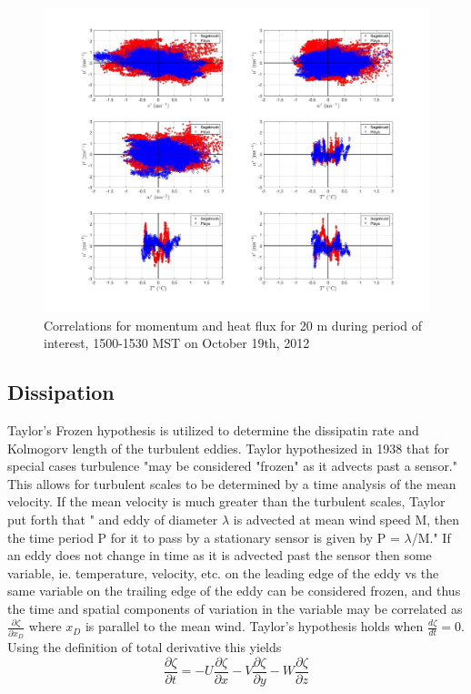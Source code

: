 \documentclass[]{article}
\begin{document}
\begin{figure}
	\centering
	\includegraphics[width=\textwidth]{momentum_corr_20m}
		\caption{Correlations for momentum and heat flux for 20 m during period of interest, 1500-1530 MST on October 19th, 2012}
	\label{fig:mom_20}
\end{figure}


\subsection{Dissipation}
Taylor's Frozen hypothesis is utilized to determine the dissipatin rate and Kolmogorv length of the turbulent eddies. Taylor hypothesized in 1938 that for special cases turbulence "may be considered "frozen" as it advects past a sensor."\cite{Stull} This allows for turbulent scales to be determined by a time analysis of the mean velocity. If the mean velocity is much greater than the turbulent scales, Taylor put forth that " and eddy of diameter $\lambda$ is advected at mean wind speed M, then the time period P for it to pass by a stationary sensor is given by P = $\lambda$/M."\cite{Stull} If an eddy does not change in time as it is advected past the sensor then some variable, ie. temperature, velocity, etc. on the leading edge of the eddy vs the same variable on the trailing edge of the eddy can be considered frozen, and thus the time and spatial components of variation in the variable may be correlated as $\frac{\partial \zeta}{\partial x_D}$ where $x_D$ is parallel to the mean wind. Taylor's hypothesis holds when $\frac{d\zeta}{dt} = 0$. Using the definition of total derivative this yields
\begin{equation} \label{eq:taylor}
\frac{\partial \zeta}{\partial t} = -U\frac{\partial \zeta}{\partial x} - V\frac{\partial \zeta}{\partial y} - W\frac{\partial \zeta}{\partial z}
\end{equation}
\end{document}
